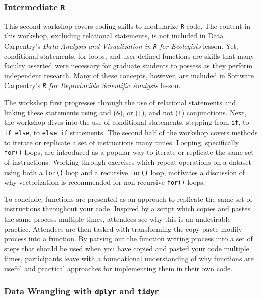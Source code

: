 \documentclass[12pt]{article}
\begin{document}
\subsubsection{Intermediate \texttt{R}}
\label{sec:intermed}

\noindent This second workshop covers coding skills to modularize \texttt{R} code. 
The content in this workshop, excluding relational statements, is not
included in Data Carpentry's \emph{Data Analysis and Visualization in \texttt{R}
for Ecologists} lesson. Yet, conditional statements, for-loops, and user-defined
functions are skills that many faculty asserted were necessary for graduate
students to possess as they perform independent research. Many of these
concepts, however, are included in Software Carpentry's 
\emph{\texttt{R} for Reproducible Scientific Analysis} lesson. 

\quad The workshop first progresses through the use of relational
statements and linking these statements using and (\texttt{\&}), or
(\texttt{|}), and not (\texttt{!}) conjunctions. Next, the workshop dives into
the use of conditional statements, stepping from \texttt{if}, to \texttt{if
else}, to \texttt{else if} statements. The second half of the workshop covers
methods to iterate or replicate a set of instructions many times. Looping,
specifically \texttt{for()} loops, are introduced as a popular way to iterate or
replicate the same set of instructions. Working through exercises which
repeat operations on a dataset using both a \texttt{for()} loop and a recursive 
\texttt{for()} loop, motivates a discussion of why vectorization is 
recommended for non-recursive \texttt{for()} loops.

\quad To conclude, functions are presented as an approach to replicate the same
set of instructions throughout your code. Inspired by a script
which copies and pastes the same process multiple times, attendees see
why this is an undesirable practice. Attendees are then tasked with transforming
the copy-paste-modify process into a function. By parsing out the function
writing process into a set of steps that should be used when you have copied and
pasted your code multiple times, participants leave with a foundational
understanding of why functions are useful and practical approaches for
implementing them in their own code.

\subsubsection{Data Wrangling with \texttt{dplyr} and \texttt{tidyr}}
\label{sec:wrangle}
\end{document}

